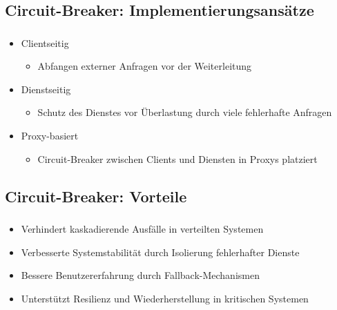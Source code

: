 \subsection{Circuit-Breaker: Implementierungsansätze}
\begin{frame}
    \frametitle{\insertsection}
    \framesubtitle{\insertsubsection}

    \begin{itemize}
        \item Clientseitig
        \begin{itemize}
            \item Abfangen externer Anfragen vor der Weiterleitung
        \end{itemize}
        \item Dienstseitig
        \begin{itemize}
            \item Schutz des Dienstes vor Überlastung durch viele fehlerhafte Anfragen
        \end{itemize}
        \item Proxy-basiert
        \begin{itemize}
            \item Circuit-Breaker zwischen Clients und Diensten in Proxys platziert
        \end{itemize}
    \end{itemize}
\end{frame}


\subsection{Circuit-Breaker: Vorteile}
\begin{frame}
    \frametitle{\insertsection}
    \framesubtitle{\insertsubsection}

    \begin{itemize}
        \item Verhindert kaskadierende Ausfälle in verteilten Systemen
        \item Verbesserte Systemstabilität durch Isolierung fehlerhafter Dienste
        \item Bessere Benutzererfahrung durch Fallback-Mechanismen
        \item Unterstützt Resilienz und Wiederherstellung in kritischen Systemen
    \end{itemize}
\end{frame}

